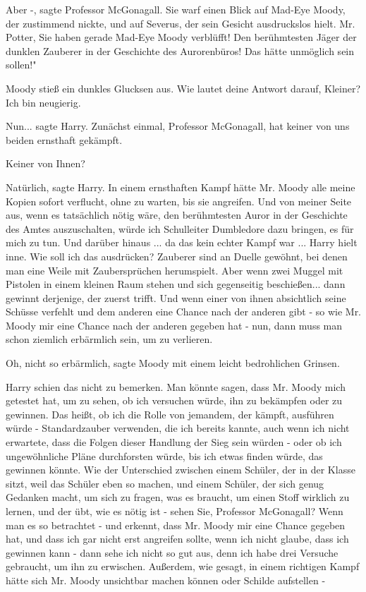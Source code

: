\glqq Aber -\grqq{}, sagte Professor McGonagall. Sie warf einen Blick auf
Mad-Eye Moody, der zustimmend nickte, und auf Severus, der sein Gesicht
ausdruckslos hielt. \glqq Mr. Potter, Sie haben gerade Mad-Eye Moody verblüfft!
Den berühmtesten Jäger der dunklen Zauberer in der Geschichte des Aurorenbüros!
Das hätte unmöglich sein sollen!"

Moody stieß ein dunkles Glucksen aus. \glqq Wie lautet deine Antwort darauf,
Kleiner? Ich bin neugierig.\grqq{}

\glqq Nun...\grqq{} sagte Harry. \glqq Zunächst einmal, Professor McGonagall,
hat keiner von uns beiden ernsthaft gekämpft.\grqq{}

\glqq Keiner von Ihnen?\grqq{}

\glqq Natürlich\grqq{}, sagte Harry. \glqq In einem ernsthaften Kampf hätte Mr.
Moody alle meine Kopien sofort verflucht, ohne zu warten, bis sie angreifen. Und
von meiner Seite aus, wenn es tatsächlich nötig wäre, den berühmtesten Auror in
der Geschichte des Amtes auszuschalten, würde ich Schulleiter Dumbledore dazu
bringen, es für mich zu tun. Und darüber hinaus ... da das kein echter Kampf war
...\grqq{} Harry hielt inne. \glqq Wie soll ich das ausdrücken? Zauberer sind an
Duelle gewöhnt, bei denen man eine Weile mit Zaubersprüchen herumspielt. Aber
wenn zwei Muggel mit Pistolen in einem kleinen Raum stehen und sich gegenseitig
beschießen... dann gewinnt derjenige, der zuerst trifft. Und wenn einer von
ihnen absichtlich seine Schüsse verfehlt und dem anderen eine Chance nach der
anderen gibt - so wie Mr. Moody mir eine Chance nach der anderen gegeben hat -
nun, dann muss man schon ziemlich erbärmlich sein, um zu verlieren.\grqq{}

\glqq Oh, nicht so erbärmlich\grqq{}, sagte Moody mit einem leicht bedrohlichen
Grinsen.

Harry schien das nicht zu bemerken. \glqq Man könnte sagen, dass Mr. Moody mich
getestet hat, um zu sehen, ob ich versuchen würde, ihn zu bekämpfen oder zu
gewinnen. Das heißt, ob ich die Rolle von jemandem, der kämpft, ausführen würde
- Standardzauber verwenden, die ich bereits kannte, auch wenn ich nicht
erwartete, dass die Folgen dieser Handlung der Sieg sein würden - oder ob ich
ungewöhnliche Pläne durchforsten würde, bis ich etwas finden würde, das gewinnen
könnte. Wie der Unterschied zwischen einem Schüler, der in der Klasse sitzt,
weil das Schüler eben so machen, und einem Schüler, der sich genug Gedanken
macht, um sich zu fragen, was es braucht, um einen Stoff wirklich zu lernen, und
der übt, wie es nötig ist - sehen Sie, Professor McGonagall? Wenn man es so
betrachtet - und erkennt, dass Mr. Moody mir eine Chance gegeben hat, und dass
ich gar nicht erst angreifen sollte, wenn ich nicht glaube, dass ich gewinnen
kann - dann sehe ich nicht so gut aus, denn ich habe drei Versuche gebraucht, um
ihn zu erwischen. Außerdem, wie gesagt, in einem richtigen Kampf hätte sich Mr.
Moody unsichtbar machen können oder Schilde aufstellen -\grqq{}

